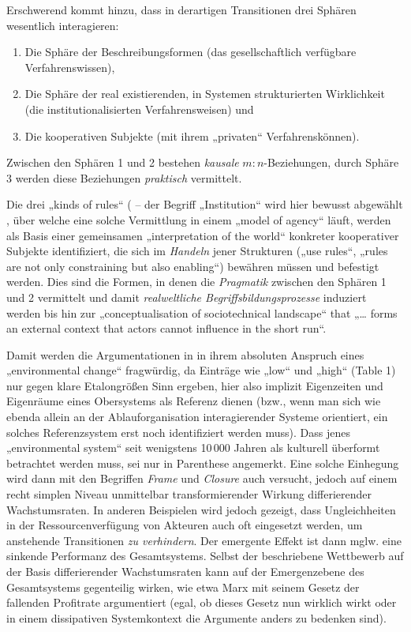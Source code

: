 \documentclass[11pt,a4paper]{article}
\begin{document}
Erschwerend kommt hinzu, dass in derartigen Transitionen drei Sphären
wesentlich interagieren:
\begin{enumerate}[noitemsep]
\item Die Sphäre der Beschreibungsformen (das gesellschaftlich verfügbare
  Verfahrenswissen),
\item Die Sphäre der real existierenden, in Systemen strukturierten
  Wirklichkeit (die institutionalisierten Verfahrensweisen) und
\item Die kooperativen Subjekte (mit ihrem „privaten“ Verfahrenskönnen).
\end{enumerate}
Zwischen den Sphären 1 und 2 bestehen \emph{kausale} $m:n$-Beziehungen, durch
Sphäre 3 werden diese Beziehungen \emph{praktisch} vermittelt.

Die drei „kinds of rules“ (\cite[3.3.]{Geels2007} -- der Begriff „Institution“
wird hier bewusst abgewählt \cite[S. 403, Fußnote 1]{Geels2007}, über welche
eine solche Vermittlung in einem „model of agency“ läuft, werden als Basis
einer gemeinsamen „interpretation of the world“ konkreter kooperativer
Subjekte identifiziert, die sich im \emph{Handeln} jener Strukturen („use
rules“, „rules are not only constraining but also enabling“) bewähren müssen
und befestigt werden. Dies sind die Formen, in denen die \emph{Pragmatik}
zwischen den Sphären 1 und 2 vermittelt und damit \emph{realweltliche
  Begriffsbildungsprozesse} induziert werden bis hin zur „conceptualisation of
sociotechnical landscape“ that „\ldots{} forms an external context that actors
cannot influence in the short run“.

Damit werden die Argumentationen in \cite[Fig. 4 und Table 1]{Geels2007} in
ihrem absoluten Anspruch eines „environmental change“ fragwürdig, da Einträge
wie „low“ und „high“ (Table 1) nur gegen klare Etalongrößen Sinn ergeben, hier
also implizit Eigenzeiten und Eigenräume eines Obersystems als Referenz dienen
(bzw., wenn man sich wie ebenda allein an der Ablauforganisation
interagierender Systeme orientiert, ein solches Referenzsystem erst noch
identifiziert werden muss). Dass jenes „environmental system“ seit wenigstens
10\,000 Jahren als kulturell überformt betrachtet werden muss, sei nur in
Parenthese angemerkt. Eine solche Einhegung wird dann mit den Begriffen
\emph{Frame} und \emph{Closure} \cite[S. 405]{Geels2007} auch versucht, jedoch
auf einem recht simplen Niveau unmittelbar transformierender Wirkung
differierender Wachstumsraten. In anderen Beispielen wird jedoch gezeigt, dass
Ungleichheiten in der Ressourcenverfügung von Akteuren auch oft eingesetzt
werden, um anstehende Transitionen \emph{zu verhindern}. Der emergente Effekt
ist dann mglw. eine sinkende Performanz des Gesamtsystems. Selbst der
beschriebene Wettbewerb auf der Basis differierender Wachstumsraten kann auf
der Emergenzebene des Gesamtsystems gegenteilig wirken, wie etwa Marx mit
seinem Gesetz der fallenden Profitrate argumentiert (egal, ob dieses Gesetz
nun wirklich wirkt oder in einem dissipativen Systemkontext die Argumente
anders zu bedenken sind).
\end{document}
